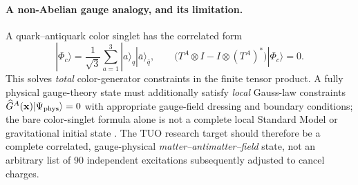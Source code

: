 \documentclass[11pt,a4paper]{article}
\theoremstyle{tmon}
\theoremstyle{definition}
\begin{document}
\paragraph{A non-Abelian gauge analogy, and its limitation.}
A quark--antiquark color singlet has the correlated form
\begin{equation}\label{eq:n001-color}
|\Phi_c\rangle=\frac{1}{\sqrt3}\sum_{a=1}^{3}|a\rangle_q|\bar a\rangle_{\bar q},\qquad
\bigl(T^A\otimes I-I\otimes(T^A)^*\bigr)|\Phi_c\rangle=0.
\end{equation}
This solves \emph{total} color-generator constraints in the finite tensor product. A fully physical gauge-theory state must additionally satisfy \emph{local} Gauss-law constraints $\widehat G^A(\mathbf x)|\Psi_{\rm phys}\rangle=0$ with appropriate gauge-field dressing and boundary conditions; the bare color-singlet formula alone is not a complete local Standard Model or gravitational initial state \cite{GaugeGauss2025}. The TUO research target should therefore be a complete correlated, gauge-physical \emph{matter--antimatter--field} state, not an arbitrary list of 90 independent excitations subsequently adjusted to cancel charges.
\end{document}
